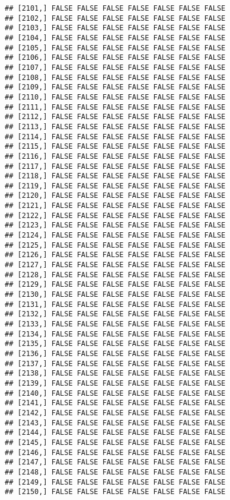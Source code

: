 \documentclass[
]{article}
\begin{document}
\begin{verbatim}
## [2101,] FALSE FALSE FALSE FALSE FALSE FALSE FALSE
## [2102,] FALSE FALSE FALSE FALSE FALSE FALSE FALSE
## [2103,] FALSE FALSE FALSE FALSE FALSE FALSE FALSE
## [2104,] FALSE FALSE FALSE FALSE FALSE FALSE FALSE
## [2105,] FALSE FALSE FALSE FALSE FALSE FALSE FALSE
## [2106,] FALSE FALSE FALSE FALSE FALSE FALSE FALSE
## [2107,] FALSE FALSE FALSE FALSE FALSE FALSE FALSE
## [2108,] FALSE FALSE FALSE FALSE FALSE FALSE FALSE
## [2109,] FALSE FALSE FALSE FALSE FALSE FALSE FALSE
## [2110,] FALSE FALSE FALSE FALSE FALSE FALSE FALSE
## [2111,] FALSE FALSE FALSE FALSE FALSE FALSE FALSE
## [2112,] FALSE FALSE FALSE FALSE FALSE FALSE FALSE
## [2113,] FALSE FALSE FALSE FALSE FALSE FALSE FALSE
## [2114,] FALSE FALSE FALSE FALSE FALSE FALSE FALSE
## [2115,] FALSE FALSE FALSE FALSE FALSE FALSE FALSE
## [2116,] FALSE FALSE FALSE FALSE FALSE FALSE FALSE
## [2117,] FALSE FALSE FALSE FALSE FALSE FALSE FALSE
## [2118,] FALSE FALSE FALSE FALSE FALSE FALSE FALSE
## [2119,] FALSE FALSE FALSE FALSE FALSE FALSE FALSE
## [2120,] FALSE FALSE FALSE FALSE FALSE FALSE FALSE
## [2121,] FALSE FALSE FALSE FALSE FALSE FALSE FALSE
## [2122,] FALSE FALSE FALSE FALSE FALSE FALSE FALSE
## [2123,] FALSE FALSE FALSE FALSE FALSE FALSE FALSE
## [2124,] FALSE FALSE FALSE FALSE FALSE FALSE FALSE
## [2125,] FALSE FALSE FALSE FALSE FALSE FALSE FALSE
## [2126,] FALSE FALSE FALSE FALSE FALSE FALSE FALSE
## [2127,] FALSE FALSE FALSE FALSE FALSE FALSE FALSE
## [2128,] FALSE FALSE FALSE FALSE FALSE FALSE FALSE
## [2129,] FALSE FALSE FALSE FALSE FALSE FALSE FALSE
## [2130,] FALSE FALSE FALSE FALSE FALSE FALSE FALSE
## [2131,] FALSE FALSE FALSE FALSE FALSE FALSE FALSE
## [2132,] FALSE FALSE FALSE FALSE FALSE FALSE FALSE
## [2133,] FALSE FALSE FALSE FALSE FALSE FALSE FALSE
## [2134,] FALSE FALSE FALSE FALSE FALSE FALSE FALSE
## [2135,] FALSE FALSE FALSE FALSE FALSE FALSE FALSE
## [2136,] FALSE FALSE FALSE FALSE FALSE FALSE FALSE
## [2137,] FALSE FALSE FALSE FALSE FALSE FALSE FALSE
## [2138,] FALSE FALSE FALSE FALSE FALSE FALSE FALSE
## [2139,] FALSE FALSE FALSE FALSE FALSE FALSE FALSE
## [2140,] FALSE FALSE FALSE FALSE FALSE FALSE FALSE
## [2141,] FALSE FALSE FALSE FALSE FALSE FALSE FALSE
## [2142,] FALSE FALSE FALSE FALSE FALSE FALSE FALSE
## [2143,] FALSE FALSE FALSE FALSE FALSE FALSE FALSE
## [2144,] FALSE FALSE FALSE FALSE FALSE FALSE FALSE
## [2145,] FALSE FALSE FALSE FALSE FALSE FALSE FALSE
## [2146,] FALSE FALSE FALSE FALSE FALSE FALSE FALSE
## [2147,] FALSE FALSE FALSE FALSE FALSE FALSE FALSE
## [2148,] FALSE FALSE FALSE FALSE FALSE FALSE FALSE
## [2149,] FALSE FALSE FALSE FALSE FALSE FALSE FALSE
## [2150,] FALSE FALSE FALSE FALSE FALSE FALSE FALSE

\end{verbatim}
\end{document}
